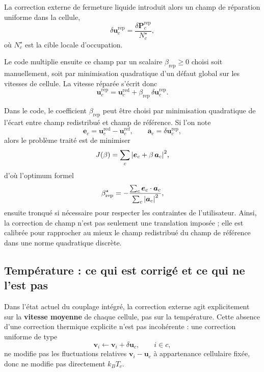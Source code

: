 \documentclass[11pt,a4paper]{article}
\begin{document}
La correction externe de fermeture liquide introduit alors un champ de réparation uniforme dans la cellule,
\begin{equation}
 \delta \bm{u}_c^{\mathrm{rep}} = \frac{\delta \bm{P}_c^{\mathrm{rep}}}{N_c^{\star}},
\end{equation}
où $N_c^{\star}$ est la cible locale d'occupation.

Le code multiplie ensuite ce champ par un scalaire $\beta_{\mathrm{rep}}\ge 0$ choisi soit manuellement, soit par minimisation quadratique d'un défaut global sur les vitesses de cellule. La vitesse réparée s'écrit donc
\begin{equation}
 \bm{u}_c^{\mathrm{rep}} = \bm{u}_c^{\mathrm{red}} + \beta_{\mathrm{rep}}\,\delta \bm{u}_c^{\mathrm{rep}}.
\end{equation}

Dans le code, le coefficient $\beta_{\mathrm{rep}}$ peut être choisi par minimisation quadratique de l'écart entre champ redistribué et champ de référence. Si l'on note
\begin{equation}
  \bm e_c = \bm u_c^{\mathrm{red}} - \bm u_c^{\mathrm{ref}},
  \qquad
  \bm a_c = \delta \bm u_c^{\mathrm{rep}},
\end{equation}
alors le problème traité est de minimiser
\begin{equation}
  J(\beta) = \sum_c \abs{\bm e_c + \beta \, \bm a_c}^2,
\end{equation}
d'où l'optimum formel
\begin{equation}
  \beta_{\mathrm{rep}}^{\star} = -\frac{\sum_c \bm e_c\cdot \bm a_c}{\sum_c \abs{\bm a_c}^2},
\end{equation}
ensuite tronqué si nécessaire pour respecter les contraintes de l'utilisateur. Ainsi, la correction de champ n'est pas seulement une translation imposée ; elle est calibrée pour rapprocher au mieux le champ redistribué du champ de référence dans une norme quadratique discrète.

\subsection{Température : ce qui est corrigé et ce qui ne l'est pas}

Dans l'état actuel du couplage intégré, la correction externe agit explicitement sur la \textbf{vitesse moyenne} de chaque cellule, pas sur la température. Cette absence d'une correction thermique explicite n'est pas incohérente : une correction uniforme de type
\begin{equation}
 \bm{v}_i \leftarrow \bm{v}_i + \delta \bm{u}_c,
 \qquad i\in c,
\end{equation}
ne modifie pas les fluctuations relatives $\bm{v}_i-\bm{u}_c$ à appartenance cellulaire fixée, donc ne modifie pas directement $k_B T_c$.
\end{document}
